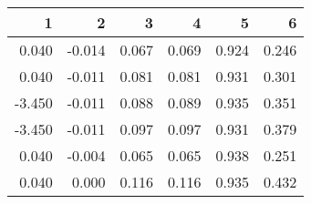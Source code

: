 \begin{table}[ht]
\centering
\begin{tabular}{rrrrrr}
  \hline
1 & 2 & 3 & 4 & 5 & 6 \\ 
  \hline
0.040 & -0.014 & 0.067 & 0.069 & 0.924 & 0.246 \\ 
  0.040 & -0.011 & 0.081 & 0.081 & 0.931 & 0.301 \\ 
  -3.450 & -0.011 & 0.088 & 0.089 & 0.935 & 0.351 \\ 
  -3.450 & -0.011 & 0.097 & 0.097 & 0.931 & 0.379 \\ 
  0.040 & -0.004 & 0.065 & 0.065 & 0.938 & 0.251 \\ 
  0.040 & 0.000 & 0.116 & 0.116 & 0.935 & 0.432 \\ 
   \hline
\end{tabular}
\end{table}
